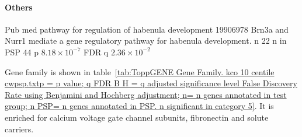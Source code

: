 \paragraph{Others}
Pub med pathway for regulation of habenula development 19906978  Brn3a and Nurr1 mediate a gene regulatory pathway for habenula development. n 22 n in PSP 44 p $8.18 \times 10^{-7}$ FDR q $2.36 \times 10^{-2}$


Gene family is shown in table~\ref{tab:ToppGENE Gene Family. kco 10 centile cwpsp.txtp = p value; q FDR B H = q adjusted significance level False Discovery Rate using Benjamini and Hochberg adjustment; n= n genes annotated in test group; n PSP= n genes annotated in PSP. n significant in category 5}. It is enriched for calcium voltage gate channel subunits, fibronectin and solute carriers.

